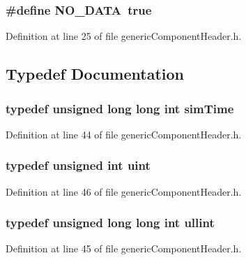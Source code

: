 \subsubsection[{NO\_\-DATA}]{\setlength{\rightskip}{0pt plus 5cm}\#define NO\_\-DATA~true}\label{genericComponentHeader_8h_68de9030c39965958f08402f7d452ad9}




Definition at line 25 of file genericComponentHeader.h.

\subsection{Typedef Documentation}
\subsubsection[{simTime}]{\setlength{\rightskip}{0pt plus 5cm}typedef unsigned long long int {\bf simTime}}\label{genericComponentHeader_8h_d88faca783e7aa496cda721d9029a2e3}




Definition at line 44 of file genericComponentHeader.h.
\subsubsection[{uint}]{\setlength{\rightskip}{0pt plus 5cm}typedef unsigned int {\bf uint}}\label{genericComponentHeader_8h_91ad9478d81a7aaf2593e8d9c3d06a14}




Definition at line 46 of file genericComponentHeader.h.
\subsubsection[{ullint}]{\setlength{\rightskip}{0pt plus 5cm}typedef unsigned long long int {\bf ullint}}\label{genericComponentHeader_8h_b03b0cc5e09b0e1f1ca05c2502cb93f4}




Definition at line 45 of file genericComponentHeader.h.
